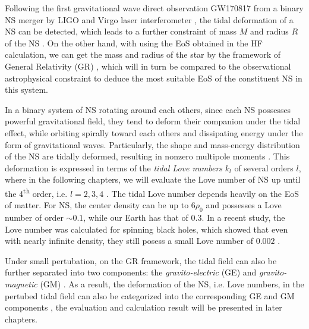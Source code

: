 
Following the first gravitational wave direct observation GW170817 from a binary \gls{NS} merger by LIGO and Virgo laser interferometer \cite{abbott2017gw170817}, the tidal deformation of a \gls{NS} can be detected, which leads to a further constraint of mass $M$ and radius $R$ of the \gls{NS} \cite{abbott2018gw170817}. On the other hand, with using the \gls{EoS} obtained in the \gls{HF} calculation, we can get the mass and radius of the star by the framework of General Relativity (\gls{GR}) \cite{tan2020spin,tan2021equation}, which will in turn be compared to the observational astrophysical constraint to deduce the most suitable \gls{EoS} of the constituent \gls{NS} in this system.\par
In a binary system of \gls{NS} rotating around each others, since each \gls{NS} possesses powerful gravitational field, they tend to deform their companion under the tidal effect, while orbiting spirally toward each others and dissipating energy under the form of gravitational waves. Particularly, the shape and mass-energy distribution of the \gls{NS} are tidally deformed, resulting in nonzero multipole moments \cite{hinderer2008tidal,hinderer2010tidal,damour2009relativistic}. This deformation is expressed in terms of the \emph{tidal Love numbers} $k_l$ of several orders $l$, where in the following chapters, we will evaluate the Love number of \gls{NS} up until the 4\textsuperscript{th} order, i.e. $l=2,3,4$ \cite{perot2021role}. The tidal Love number depends heavily on the \gls{EoS} of matter. For \gls{NS}, the center density can be up to $6\rho_0$ and possesses a Love number of order $\sim 0.1$, while our Earth has that of $0.3$. In a recent study, the Love number was calculated for spinning black holes, which showed that even with nearly infinite density, they still posess a small Love number of $0.002$ \cite{le2021spinning}.\par
Under small pertubation, on the \gls{GR} framework, the tidal field can also be further separated into two components: the \emph{gravito-electric} (\gls{GE}) and \emph{gravito-magnetic} (\gls{GM}) \cite{damour2009relativistic}. As a result, the deformation of the \gls{NS}, i.e. Love numbers, in the pertubed tidal field can also be categorized into the corresponding \gls{GE} and \gls{GM} components \cite{perot2021role}, the evaluation and calculation result will be presented in later chapters.
